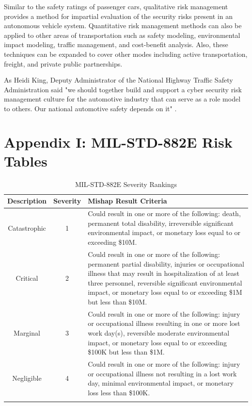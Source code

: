\documentclass{article}
\begin{document}
Similar to the safety ratings of passenger cars, qualitative risk management provides a method for impartial evaluation of the security risks present in an autonomous vehicle system. Quantitative risk management methods can also be applied to other areas of transportation such as safety modeling, environmental impact modeling, traffic management, and cost-benefit analysis. Also, these techniques can be expanded to cover other modes including active transportation, freight, and private public partnerships.

As Heidi King, Deputy Administrator of the National Highway Traffic Safety Administration said "we should together build and support a cyber security risk management culture for the automotive industry that can serve as a role model to others. Our national automotive safety depends on it" \citep{king_remarks_2018}.


\newpage
\section{Appendix I: MIL-STD-882E Risk Tables}

\begin{table}[h]
    \begin{tabularx}{\linewidth}{c | c | X}
        Description & Severity & Mishap Result Criteria \\ \hline
        Catastrophic & 1 & Could result in one or more of the following: death, permanent total disability, irreversible significant environmental impact, or monetary loss equal to or exceeding \$10M. \\
        Critical & 2 & Could result in one or more of the following: permanent partial disability, injuries or occupational illness that may result in hospitalization of at least three personnel, reversible significant environmental impact, or monetary loss equal to or exceeding \$1M but less than \$10M. \\
        Marginal & 3 & Could result in one or more of the following: injury or occupational illness resulting in one or more lost work day(s), reversible moderate environmental impact, or monetary loss equal to or exceeding \$100K but less than \$1M. \\
        Negligible & 4 & Could result in one or more of the following: injury or occupational illness not resulting in a lost work day, minimal environmental impact, or monetary loss less than \$100K. \\
    \caption{MIL-STD-882E Severity Rankings \citep{department_of_defense_mil-std-882e_2012}}
    \end{tabularx}
    \label{department_of_defense_mil-std-882e_2012_severity_rankings}
\end{table}
\end{document}
